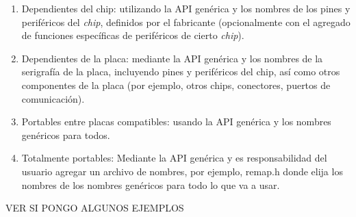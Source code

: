 \begin{enumerate}
\item
Dependientes del chip: utilizando la API genérica y los nombres de los pines y periféricos del \emph{chip}, definidos por el fabricante (opcionalmente con el agregado de funciones específicas de periféricos de cierto \emph{chip}).
\item
Dependientes de la placa: mediante la API genérica y los nombres de la serigrafía de la placa, incluyendo pines y periféricos del chip, así como otros componentes de la placa (por ejemplo, otros chips, conectores, puertos de comunicación).
\item
Portables entre placas compatibles: usando la API genérica y los nombres genéricos para todos.
\item
Totalmente portables: Mediante la API genérica y es responsabilidad del usuario agregar un archivo de nombres, por ejemplo, remap.h donde elija los nombres de los nombres genéricos para todo lo que va a usar.
\end{enumerate}

VER SI PONGO ALGUNOS EJEMPLOS



